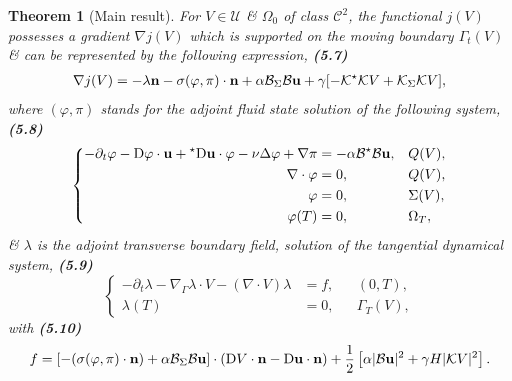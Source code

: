 \documentclass[oneside]{book}
\numberwithin{equation}{section}
\newtheorem{theorem}{Theorem}[chapter]
\begin{document}
\begin{theorem}[Main result]
	For $V\in\mathcal{U}$ \& $\Omega_0$ of class $\mathcal{C}^2$, the functional $j(V)$ possesses a gradient $\nabla j(V)$ which is supported on the moving boundary $\Gamma_t(V)$ \& can be represented by the following expression, \textbf{(5.7)}
	\begin{align*}
		\nabla j(V) = -\lambda{\bf n} - \sigma(\varphi,\pi)\cdot{\bf n} + \alpha\mathcal{B}_\Sigma\mathcal{B}{\bf u} + \gamma[-\mathcal{K}^\star\mathcal{K}V + \mathcal{K}_\Sigma\mathcal{K}V],
	\end{align*}
	where $(\varphi,\pi)$ stands for the adjoint fluid state solution of the following system, \textbf{(5.8)}
	\begin{equation*}
		\left\{\begin{split}
			-\partial_t\varphi - {\rm D}\varphi\cdot{\bf u} + {}^\star{\rm D}{\bf u}\cdot\varphi - \nu\Delta\varphi + \nabla\pi &= -\alpha\mathcal{B}^\star\mathcal{B}{\bf u},&&Q(V),\\
			\nabla\cdot\varphi &= 0,&&Q(V),\\
			\varphi &= 0,&&\Sigma(V),\\
			\varphi(T) &= 0,&&\Omega_T,
		\end{split}\right.
	\end{equation*}
	\& $\lambda$ is the adjoint transverse boundary field, solution of the tangential dynamical system, \textbf{(5.9)}
	\begin{equation*}
		\left\{\begin{split}
			-\partial_t\lambda - \nabla_\Gamma\lambda\cdot V - (\nabla\cdot V)\lambda &= f,&&(0,T),\\
			\lambda(T) &= 0,&&\Gamma_T(V),
		\end{split}\right.
	\end{equation*}
	with \textbf{(5.10)}
	\begin{align*}
		f = [-(\sigma(\varphi,\pi)\cdot{\bf n}) + \alpha\mathcal{B}_\Sigma\mathcal{B}{\bf u}]\cdot({\rm D}V\cdot{\bf n} - {\rm D}{\bf u}\cdot{\bf n}) + \frac{1}{2}\left[\alpha|\mathcal{B}{\bf u}|^2 + \gamma H|\mathcal{K}V|^2\right].
	\end{align*}
\end{theorem}
\end{document}
